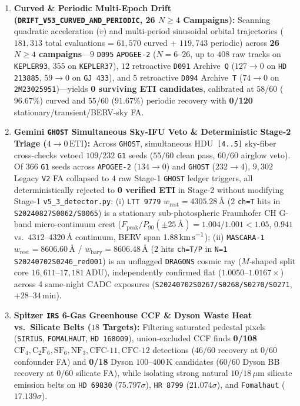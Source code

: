 \documentclass[twocolumn,10pt]{article}
\begin{document}
\begin{enumerate}
  \item \textbf{Curved \& Periodic Multi-Epoch Drift (\texttt{DRIFT\_V53\_CURVED\_AND\_PERIODIC}, 26 $N\ge 4$ Campaigns):} Scanning quadratic acceleration ($\ddot{v}$) and multi-period sinusoidal orbital trajectories ($181{,}313$ total evaluations = $61{,}570$ curved + $119{,}743$ periodic) across \textbf{26 $N\ge 4$ campaigns}---$9$ \texttt{D095} \texttt{APOGEE-2} ($N=6\text{--}26$, up to $408$ raw tracks on \texttt{KEPLER93}, $355$ on \texttt{KEPLER37}), $12$ retroactive \texttt{D091} Archive~\texttt{Q} ($127\rightarrow 0$ on \texttt{HD\,213885}, $59\rightarrow 0$ on \texttt{GJ\,433}), and $5$ retroactive \texttt{D094} Archive~\texttt{T} ($74\rightarrow 0$ on \texttt{2M23025951})---yields \textbf{0 surviving ETI candidates}, calibrated at $58/60$ ($96.67\%$) curved and $55/60$ ($91.67\%$) periodic recovery with \textbf{0/120} stationary/transient/BERV-sky FA.
  \item \textbf{Gemini \texttt{GHOST} Simultaneous Sky-IFU Veto \& Deterministic Stage-2 Triage ($4\rightarrow 0\,\mathrm{ETI}$):} Across \texttt{GHOST}, simultaneous HDU~\texttt{[4..5]} sky-fiber cross-checks vetoed $109/232$ \texttt{G1} seeds ($55/60$ clean pass, $60/60$ airglow veto). Of $366$ \texttt{G1} seeds across \texttt{APOGEE-2} ($134\rightarrow 0$) and \texttt{GHOST} ($232\rightarrow 4$), $9{,}302$ Legacy \texttt{V2} FA collapsed to $4$ raw Stage-1 \texttt{GHOST} ledger triggers, all deterministically rejected to \textbf{0 verified ETI} in Stage-2 without modifying Stage-1 \texttt{v5\_3\_detector.py}: (i) \texttt{LTT\,9779} $w_{\mathrm{rest}}=4305.28\,\text{\AA}$ ($2$ \texttt{ch=T} hits in \texttt{S20240827S0062/S0065}) is a stationary sub-photospheric Fraunhofer CH G-band micro-continuum crest ($F_{\mathrm{peak}}/P_{90}(\pm 25\,\text{\AA})=1.004/1.001 < 1.05$, $0.941$ vs.\ $4312\text{--}4320\,\text{\AA}$ continuum, BERV span $1.88\,\text{km\,s}^{-1}$); (ii) \texttt{MASCARA-1} $w_{\mathrm{rest}}=8606.60\,\text{\AA}$ / $w_{\mathrm{bary}}=8606.48\,\text{\AA}$ ($2$ hits \texttt{ch=T/P} in \texttt{N=1} \texttt{S20240702S0246\_red001}) is an unflagged \texttt{DRAGONS} cosmic ray ($M$-shaped split core $16{,}611\text{--}17{,}181\,\text{ADU}$), independently confirmed flat ($1.0050\text{--}1.0167\times$) across 4 same-night CADC exposures (\texttt{S20240702S0267/S0268/S0270/S0271}, $+28\text{--}34\,\text{min}$).
  \item \textbf{Spitzer \texttt{IRS} 6-Gas Greenhouse CCF \& Dyson Waste Heat vs.\ Silicate Belts ($18$ Targets):} Filtering saturated pedestal pixels (\texttt{SIRIUS}, \texttt{FOMALHAUT}, \texttt{HD\,168009}), union-excluded CCF finds \textbf{0/108} $\mathrm{CF_4, C_2F_6, SF_6, NF_3, CFC\text{-}11, CFC\text{-}12}$ detections ($46/60$ recovery at $0/60$ confounder FA) and \textbf{0/18} Dyson $100\text{--}400\,\text{K}$ candidates ($60/60$ Dyson BB recovery at $0/60$ silicate FA), while isolating strong natural $10/18\,\mu\text{m}$ silicate emission belts on \texttt{HD\,69830} ($75.797\sigma$), \texttt{HR\,8799} ($21.074\sigma$), and \texttt{Fomalhaut} ($17.139\sigma$).

\end{enumerate}
\end{document}
